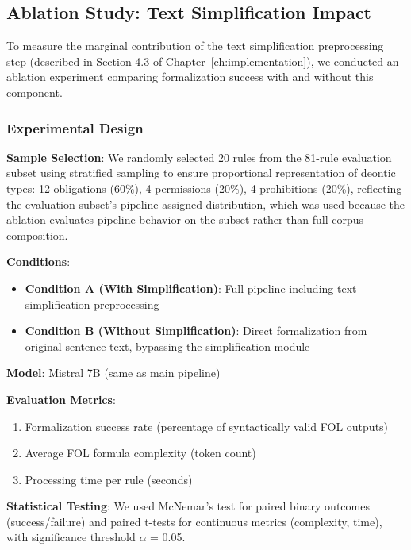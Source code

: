\subsection{Ablation Study: Text Simplification Impact}
\label{sec:ablation-simplification}

To measure the marginal contribution of the text simplification preprocessing step (described in Section 4.3 of Chapter~\ref{ch:implementation}), we conducted an ablation experiment comparing formalization success with and without this component.

\subsubsection{Experimental Design}

\textbf{Sample Selection}: We randomly selected 20 rules from the 81-rule evaluation subset using stratified sampling to ensure proportional representation of deontic types: 12 obligations (60\%), 4 permissions (20\%), 4 prohibitions (20\%), reflecting the evaluation subset's pipeline-assigned distribution, which was used because the ablation evaluates pipeline behavior on the subset rather than full corpus composition.

\textbf{Conditions}:
\begin{itemize}
    \item \textbf{Condition A (With Simplification)}: Full pipeline including text simplification preprocessing
    \item \textbf{Condition B (Without Simplification)}: Direct formalization from original sentence text, bypassing the simplification module
\end{itemize}

\textbf{Model}: Mistral 7B (same as main pipeline)

\textbf{Evaluation Metrics}:
\begin{enumerate}
    \item Formalization success rate (percentage of syntactically valid FOL outputs)
    \item Average FOL formula complexity (token count)
    \item Processing time per rule (seconds)
\end{enumerate}

\textbf{Statistical Testing}: We used McNemar's test for paired binary outcomes (success/failure) and paired t-tests for continuous metrics (complexity, time), with significance threshold $\alpha$ = 0.05.

